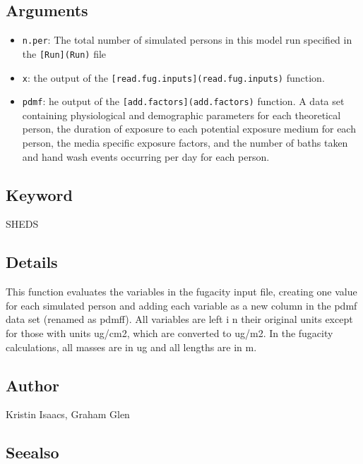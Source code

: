\documentclass[
]{article}
\providecommand{\tightlist}{%
  \setlength{\itemsep}{0pt}\setlength{\parskip}{0pt}}
\begin{document}
\hypertarget{arguments-2}{%
\subsection{Arguments}\label{arguments-2}}

\begin{itemize}
\tightlist
\item
  \texttt{n.per}: The total number of simulated persons in this model
  run specified in the \texttt{{[}Run{]}(Run)} file
\item
  \texttt{x}: the output of the
  \texttt{{[}read.fug.inputs{]}(read.fug.inputs)} function.
\item
  \texttt{pdmf}: he output of the
  \texttt{{[}add.factors{]}(add.factors)} function. A data set
  containing physiological and demographic parameters for each
  theoretical person, the duration of exposure to each potential
  exposure medium for each person, the media specific exposure factors,
  and the number of baths taken and hand wash events occurring per day
  for each person.
\end{itemize}

\hypertarget{keyword}{%
\subsection{Keyword}\label{keyword}}

SHEDS

\hypertarget{details-2}{%
\subsection{Details}\label{details-2}}

This function evaluates the variables in the fugacity input file,
creating one value for each simulated person and adding each variable as
a new column in the pdmf data set (renamed as pdmff). All variables are
left i n their original units except for those with units ug/cm2, which
are converted to ug/m2. In the fugacity calculations, all masses are in
ug and all lengths are in m.

\hypertarget{author-2}{%
\subsection{Author}\label{author-2}}

Kristin Isaacs, Graham Glen

\hypertarget{seealso-2}{%
\subsection{Seealso}\label{seealso-2}}
\end{document}
